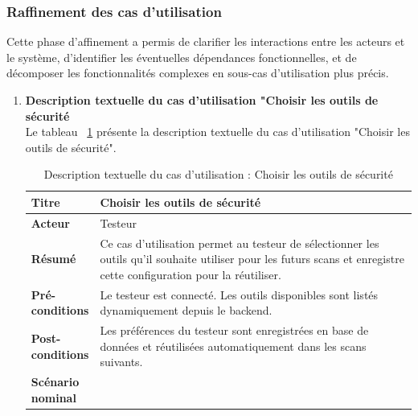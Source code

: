 \subsubsection{Raffinement des cas d’utilisation}
Cette phase d’affinement a permis de clarifier les interactions entre les acteurs et le système, d’identifier les éventuelles dépendances fonctionnelles, et de décomposer les fonctionnalités complexes en sous-cas d’utilisation plus précis.
\begin{enumerate}[label=\alph*), left=-0.1cm]
    \item \textbf{Description textuelle du cas d’utilisation "Choisir les outils de sécurité}\\
        Le tableau ~\ref{tab:tools-select}  présente la description textuelle du cas d’utilisation "Choisir les outils de sécurité".
                  \begin{spacing}{1}
                        \begin{longtable}{|p{0.12\linewidth}|p{0.88\linewidth}|}
                            \caption{Description textuelle du cas d’utilisation : Choisir les outils de sécurité}
                            \label{tab:tools-select}\\
                            \hline
                            \textbf{Titre} & Choisir les outils de sécurité \\
                            \hline
                            \textbf{Acteur} & Testeur \\
                            \hline
                            \textbf{Résumé} & Ce cas d'utilisation permet au testeur de sélectionner les outils qu’il souhaite utiliser pour les futurs scans et enregistre cette configuration pour la réutiliser. \\
                            \hline
                            \textbf{Pré-conditions} & Le testeur est connecté. Les outils disponibles sont listés dynamiquement depuis le backend. \\
                            \hline
                            \textbf{Post-conditions} & Les préférences du testeur sont enregistrées en base de données et réutilisées automatiquement dans les scans suivants. \\
                            \hline
                            \textbf{Scénario nominal} & 
                            \begin{minipage}{\linewidth}
                                \vspace{0.1cm}
                                \begin{enumerate}[label=\arabic*., left=0.1cm]

\end{enumerate}
\end{minipage}
\end{longtable}
\end{spacing}
\end{enumerate}
